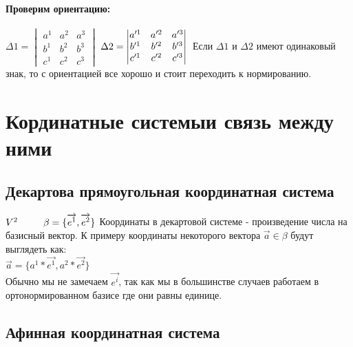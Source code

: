 \documentclass{article}
\begin{document}
\paragraph*{Проверим ориентацию:\\}
$\Delta1=\begin{vmatrix}
    a^1 & a^2 & a^3\\
    b^1 & b^2 & b^3\\
    c^1 & c^2 & c^3
\end{vmatrix}
$
$\Delta2=\begin{vmatrix}
    a'^1 & a'^2 & a'^3\\
    b'^1 & b'^2 & b'^3\\
    c'^1 & c'^2 & c'^3
\end{vmatrix}
\\$
Если $\Delta1$ и $\Delta2$ имеют одинаковый знак, то с ориентацией все хорошо и стоит переходить к нормированию.
\newpage
\section{Кординатные системы и связь между ними}
\subsection{Декартова прямоугольная координатная система}
$V^2\ \ \ \ \ \ \ \ \beta=\{\overrightarrow{e^1},\overrightarrow{e^2}\}\\$
Координаты в декартовой системе - произведение числа на базисный вектор. К примеру координаты некоторого вектора $\overrightarrow{a} \in \beta$ будут выглядеть как:\\
$\overrightarrow{a}=\{a^1*\overrightarrow{e^1},a^2*\overrightarrow{e^2}\}$\\
Обычно мы не замечаем $\overrightarrow{e^i}$, так как мы в большинстве случаев работаем в ортонормированном базисе где они равны единице.
\begin{figure}[h!]
\end{figure}
\subsection{Афинная координатная система}
\newpage
\end{document}

